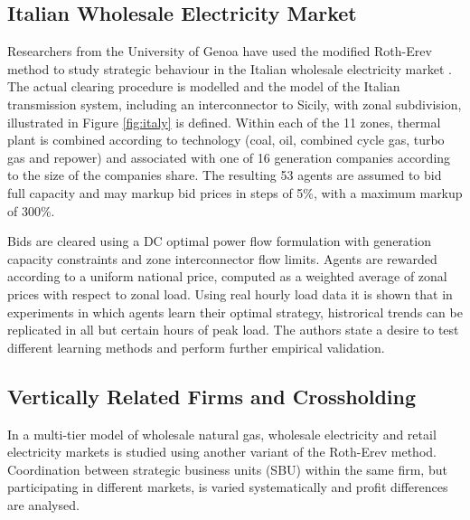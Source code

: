\subsection{Italian Wholesale Electricity Market}

Researchers from the University of Genoa have used the modified Roth-Erev
method to study strategic behaviour in the Italian wholesale electricity market
\cite{cincotti:09}.  The actual clearing procedure is modelled and the
model of the Italian transmission system, including an interconnector to
Sicily, with zonal subdivision, illustrated in Figure \ref{fig:italy} is
defined.  Within each of the 11 zones, thermal plant is combined according to technology (coal, oil, combined cycle gas, turbo gas and
repower) and associated with one of 16 generation companies according to the
size of the companies share.  The resulting 53 agents are assumed to bid full
capacity and may markup bid prices in steps of 5\%, with a maximum markup of
300\%.


Bids are cleared using a DC optimal power flow formulation with
generation capacity constraints and zone interconnector flow limits.  Agents are
rewarded according to a uniform national price, computed as a weighted average
of zonal prices with respect to zonal load.  Using real hourly load data it
is shown that in experiments in which agents learn their optimal
strategy, histrorical trends can be replicated in all but certain hours of
peak load.  The authors state a desire to test different learning methods and perform
further empirical validation.

\subsection{Vertically Related Firms and Crossholding}
In \cite{micola:08} a multi-tier model of wholesale natural gas, wholesale
electricity and retail electricity markets is studied using another variant of
the Roth-Erev method.  Coordination between strategic business units (SBU)
within the same firm, but participating in different markets, is varied
systematically and profit differences are analysed.

